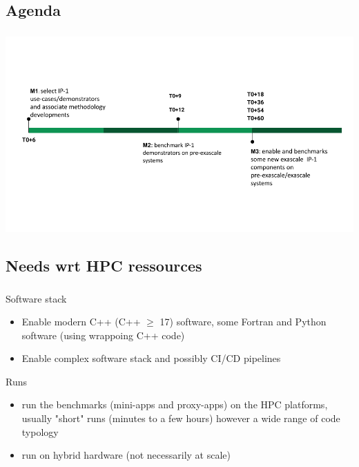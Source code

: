 \subsection{Agenda}
\begin{frame}
  \frametitle{\insertsectionhead}
  \framesubtitle{\insertsubsectionhead}

  \includegraphics[width=\linewidth]{../../figures/exama-timeline.png}
\end{frame}

\subsection{Needs wrt HPC ressources} 
\begin{frame}
  \frametitle{\insertsectionhead}
  \framesubtitle{\insertsubsectionhead}
  
  Software stack
  \begin{itemize}
    \item Enable modern C++ (C++ $\geq$ 17) software, some Fortran and Python software (using wrappoing C++ code)
    \item Enable complex software stack and possibly CI/CD pipelines
  \end{itemize}

  Runs
  \begin{itemize}
    \item run the benchmarks (mini-apps and proxy-apps) on the HPC platforms, usually "short" runs (minutes to a few hours) however a wide range of code typology
    \item run on hybrid hardware (not necessarily at scale)
  \end{itemize} 


\end{frame}

